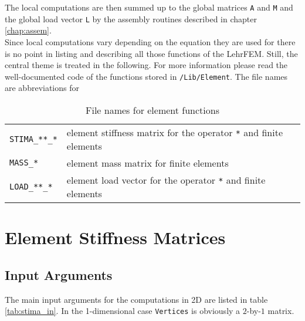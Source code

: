 The local computations are then summed up to the global matrices {\tt A} and {\tt M} and the global load vector {\tt L} by the assembly routines described in chapter \ref{chap:assem}. \\

 Since local computations vary depending on the equation they are used for there is no point in listing and describing all those \MATLAB functions of the LehrFEM. Still, the central theme is treated in the following. For more information please read the well-documented code of the functions stored in {\tt /Lib/Element}. The file names are abbreviations for

\begin{table}[htb]
  \begin{tabular}{p{1.8cm}p{9.2cm}}
    {\tt STIMA\_**\_*} & {\small element stiffness matrix for the operator {\tt **} and finite elements {\tt *}} \\
    {\tt MASS\_*} & {\small element mass matrix for finite elements {\tt *}} \\
    {\tt LOAD\_**\_*} & {\small element load vector for the operator {\tt **} and finite elements {\tt *}}
  \end{tabular}
  \caption{File names for element functions}
  \label{tab:element}
\end{table}



\section{Element Stiffness Matrices} \label{sect:stima} 

\subsection{Input Arguments} 

 The main input arguments for the computations in 2D are listed in table \ref{tab:stima_in}. In the 1-dimensional case {\tt Vertices} is obviously a $2$-by-$1$ matrix.

